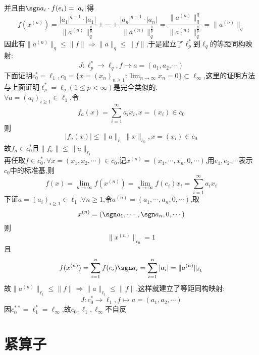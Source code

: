 并且由$\sgn a_i\cdot f(e_i)=|a_i|$得
\[f(x^{(n)})=\frac{|a_1|^{q-1}\cdot|a_1|}{\|a^{(n)}\|^{\frac{q}{p}}_q}+\cdots+\frac{|a_n|^{q-1}\cdot|a_n|}{\|a^{(n)}\|^{\frac{q}{p}}_q}=\frac{\|a^{(n)}\|_q^q}{\|a^{(n)}\|_q^\frac{q}{p}}=\|a^{(n)}\|_q\]
因此有$\|a^{(n)}\|_q\leq\|f\|\Rightarrow\|a\|_q\leq\|f\|$,于是建立了$\ell_p^*$到$\ell_q$的等距同构映射:
\[J:\ell_p^*\to\ell_q,f\mapsto a=(a_1,a_2,\cdots)\]
下面证明$c_0^*=\ell_1,c_0=\{x=(x_n)_{n\geq1}:\lim_{n\to\infty}x_n=0\}\subset\ell_{\infty}$,这里的证明方法与上面证明$\ell_p^*=\ell_q(1\leq p<\infty)$是完全类似的.\\
$\forall a=(a_i)_{i\geq 1}\in\ell_1$,令
\[f_a(x)=\sum_{i=1}^{\infty}a_ix_i,x=(x_i)\in c_0\]
则\[|f_a(x)|\leq\|a\|_{\ell_1}\|x\|_{c_0},x=(x_i)\in c_0\]
故$f_a\in c_0^*$且$\|f_a\|\leq\|a\|_{\ell_1}$\\
再任取$f\in c_0^*,\forall x=(x_1,x_2,\cdots)\in c_0$,记$x^{(n)}=(x_1,\cdots,x_n,0,\cdots)$,用$e_1,e_2,\cdots$表示$c_0$中的标准基,则
\[f(x)=\lim_{n\to\infty}f(x^{(n)})=\lim_{n\to\infty}f(e_i)x_i=\sum_{i=1}^{\infty}a_ix_i\]
下证$a=(a_i)_{i\geq 1}\in\ell_1.\forall n\geq1$,令$a^{(n)}=(a_1,\cdots,a_n,0,\cdots)$,取
\[x^{(n)}=(\sgn a_1,\cdots,\sgn a_n,0,\cdots)\]
则\[\|x^{(n)}\|_{c_0}=1\]
且\[f(x^{(n)})=\sum_{i=1}^nf(e_i)\sgn a_i=\sum_{i=1}^n|a_i|=\|a^{(n)}\|_{\ell_1}\]
故$\|a^{(n)}\|_{\ell_1}\leq\|f\|\Rightarrow\|a\|_{\ell_1}\leq\|f\|$,这样就建立了等距同构映射:
\[J:c_0^*\to\ell_1,f\mapsto a=(a_1,a_2,\cdots)\]
因$c_0^{**}=\ell_1^*=\ell_{\infty}$,故$c_0,\ell_1,\ell_{\infty}$不自反
\chapter{紧算子}
\thispagestyle{empty}